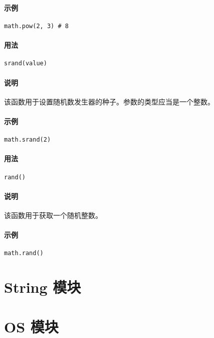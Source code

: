 \paragraph{示例}
\begin{lstlisting}[language=berry, numbers=none]
math.pow(2, 3) # 8
\end{lstlisting}


\paragraph{用法}
\begin{lstlisting}[language=berry, numbers=none]
srand(value)
\end{lstlisting}

\paragraph{说明}
该函数用于设置随机数发生器的种子。参数的类型应当是一个整数。

\paragraph{示例}
\begin{lstlisting}[language=berry, numbers=none]
math.srand(2)
\end{lstlisting}


\paragraph{用法}
\begin{lstlisting}[language=berry, numbers=none]
rand()
\end{lstlisting}

\paragraph{说明}
该函数用于获取一个随机整数。

\paragraph{示例}
\begin{lstlisting}[language=berry, numbers=none]
math.rand()
\end{lstlisting}

\section{String 模块}

\section{OS 模块}
